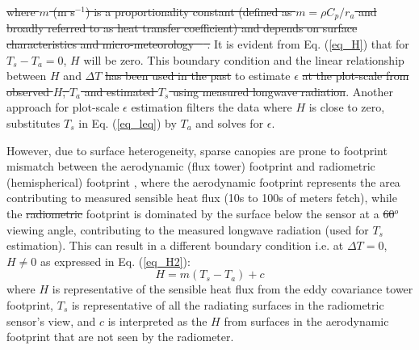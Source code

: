 \documentclass[fleqn,10pt]{wlscirep}
\providecommand{\DIFaddtex}[1]{{\protect\color{blue}\uwave{#1}}} %
\providecommand{\DIFdeltex}[1]{{\protect\color{red}\sout{#1}}}                      %
\providecommand{\DIFaddbegin}{} %
\providecommand{\DIFaddend}{} %
\providecommand{\DIFdelbegin}{} %
\providecommand{\DIFdelend}{} %
\providecommand{\DIFadd}[1]{\texorpdfstring{\DIFaddtex{#1}}{#1}} %
\providecommand{\DIFdel}[1]{\texorpdfstring{\DIFdeltex{#1}}{}} %
\begin{document}
\DIFdel{where $m$ (m s$^{-1}$) is a proportionality constant (defined as $m=\rho C_{p}/r_{a}$ and broadly referred to as heat transfer coefficient) and depends on surface characteristics and micro-meteorology \mbox{%
\cite{lhomme1988radiative}}\hspace{0pt}%
. }\DIFdelend It is evident from Eq. (\ref{eq_H}) that for $T_{s} - T_{a} = 0$, $H$ will be zero. This boundary condition and the linear relationship  between $H$ and $\Delta T $ \DIFdelbegin \DIFdel{has been used in the past }\DIFdelend \DIFaddbegin \DIFadd{is used }\DIFaddend to estimate $\epsilon$ \DIFdelbegin \DIFdel{at the plot-scale from observed $H$, $T_a$ and estimated $T_{s}$ using measured longwave radiation}\DIFdelend \cite{holmes2009land,holmes2016cloud}. Another approach for plot-scale $\epsilon$ estimation filters the data where $H$ is close to zero, substitutes $T_{s}$ in Eq. (\ref{eq_leq}) by $T_{a}$ and solves for $\epsilon$\cite{maes2019potential}. 

However, due to surface heterogeneity, sparse canopies are prone to footprint mismatch between the aerodynamic (flux tower) footprint and radiometric (hemispherical) footprint \cite{chu2021representativeness,marcolla2018geometry,morillas2013using}, where the aerodynamic footprint represents the area contributing to measured sensible heat flux (10s to 100s of meters fetch), while the \DIFdelbegin \DIFdel{radiometric }\DIFdelend \DIFaddbegin \DIFadd{radiometer }\DIFaddend footprint is dominated by the surface below the sensor at a \DIFdelbegin \DIFdel{60$^o$ }\DIFdelend \DIFaddbegin \DIFadd{nadir }\DIFaddend viewing angle, contributing to the measured longwave radiation (used for $T_{s}$ estimation). This can result in a different boundary condition i.e. at $\Delta T =0$, $H \not= 0$ as expressed in Eq. (\ref{eq_H2}): 
\begin{equation}\label{eq_H2}
H= m(T_{s} - T_{a}) +  c    
\end{equation}
where $H$ is representative of the sensible heat flux from the eddy covariance tower footprint, $T_{s}$ is representative of all the radiating surfaces in the radiometric sensor’s view, and $c$ is interpreted as the $H$ from surfaces in the aerodynamic footprint that are not seen by the radiometer. 
\end{document}
